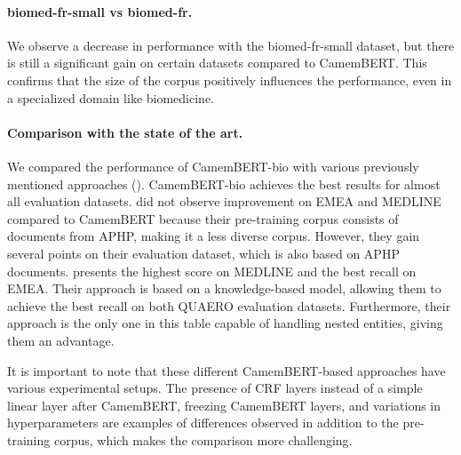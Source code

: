 \paragraph{biomed-fr-small vs biomed-fr.} We observe a decrease in performance with the biomed-fr-small dataset, but there is still a significant gain on certain datasets compared to CamemBERT. This confirms that the size of the corpus positively influences the performance, even in a specialized domain like biomedicine.

\paragraph{Comparison with the state of the art.} We compared the performance of CamemBERT-bio with various previously mentioned approaches (). CamemBERT-bio achieves the best results for almost all evaluation datasets. \citet{dura_learning_2022} did not observe improvement on EMEA and MEDLINE compared to CamemBERT because their pre-training corpus consists of documents from APHP, making it a less diverse corpus. However, they gain several points on their evaluation dataset, which is also based on APHP documents. \citet{mulligen_erasmus_2016} presents the highest score on MEDLINE and the best recall on EMEA. Their approach is based on a knowledge-based model, allowing them to achieve the best recall on both QUAERO evaluation datasets. Furthermore, their approach is the only one in this table capable of handling nested entities, giving them an advantage.

\begin{reviewread}
It is important to note that these different CamemBERT-based approaches have various experimental setups. The presence of CRF layers instead of a simple linear layer after CamemBERT, freezing CamemBERT layers, and variations in hyperparameters are examples of differences observed in addition to the pre-training corpus, which makes the comparison more challenging.
\end{reviewread}

